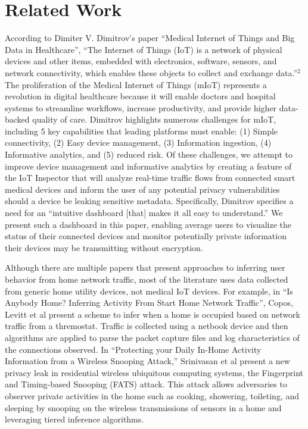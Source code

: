 
\section{Related Work}

According to Dimiter V. Dimitrov's paper ``Medical Internet of Things and Big Data in Healthcare'', ``The Internet of Things (IoT) is a network of physical devices and other items, embedded with electronics, software, sensors, and network connectivity, which enables these objects to collect and exchange data.''$^2$ The proliferation of the Medical Internet of Things (mIoT) represents a revolution in digital healthcare because it will enable doctors and hospital systems to streamline workflows, increase productivity, and provide higher data-backed quality of care. Dimitrov highlights numerous challenges for mIoT, including 5 key capabilities that leading platforms must enable: (1) Simple connectivity, (2) Easy device management, (3) Information ingestion, (4) Informative analytics, and (5) reduced risk. Of these challenges, we attempt to improve device management and informative analytics by creating a feature of the IoT Inspector that will analyze real-time traffic flows from connected smart medical devices and inform the user of any potential privacy vulnerabilities should a device be leaking sensitive metadata. Specifically, Dimitrov specifies a need for an ``intuitive dashboard [that] makes it all easy to understand.'' We present such a dashboard in this paper, enabling average users to visualize the status of their connected devices and monitor potentially private information their devices may be transmitting without encryption. 

Although there are multiple papers that present approaches to inferring user behavior from home network traffic, most of the literature uses data collected from generic home utility devices, not medical IoT devices. For example, in ``Is Anybody Home? Inferring Activity From Start Home Network Traffic'', Copos, Levitt et al present a scheme to infer when a home is occupied based on network traffic from a thremostat. Traffic is collected using a netbook device and then algorithms are applied to parse the packet capture files and log characteristics of the connections observed. In ``Protecting your Daily In-Home Activity Information from a Wireless Snooping Attack,'' Srinivasan et al present a new privacy leak in residential wireless ubiquitous computing systems, the Fingerprint and Timing-based Snooping (FATS) attack. This attack allows adversaries to observer private activities in the home such as cooking, showering, toileting, and sleeping by snooping on the wireless transmissions of sensors in a home and leveraging tiered inference algorithms.

